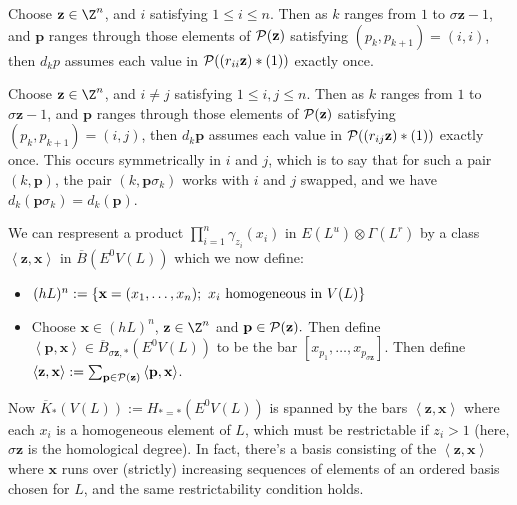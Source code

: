 \documentclass[10pt]{article}
\begin{document}
\begin{PRlieKoszulComplexCalculation}
\begin{prop}
Choose $\textbf{z}\in\Z^n$, and $i$ satisfying $1\leq i\leq n$. Then as $k$ ranges from $1$ to $\sigma \textbf{z}-1$, and $\textbf{p}$ ranges through those elements of $\mathcal{P}(\textbf{z})$ satisfying $(p_k,p_{k+1})=(i,i)$, then $d_kp$ assumes each value in $\mathcal{P}((r_{ii}\textbf{z})*(1))$ exactly once.
\end{prop}
\begin{prop}
Choose $\textbf{z}\in\Z^n$, and $i\neq j$ satisfying $1\leq i,j\leq n$. Then as $k$ ranges from $1$ to $\sigma \textbf{z}-1$, and $\textbf{p}$ ranges through those elements of $\mathcal{P}(\textbf{z})$ satisfying $(p_k,p_{k+1})=(i,j)$, then $d_k\textbf{p}$ assumes each value in $\mathcal{P}((r_{ij}\textbf{z})*(1))$ exactly once. This occurs symmetrically in $i$ and $j$, which is to say that for such a pair $(k,\textbf{p})$, the pair $(k,\textbf{p}\sigma_k)$ works with $i$ and $j$ swapped, and we have $d_k(\textbf{p}\sigma_k)=d_k(\textbf{p})$.
\end{prop}


We can respresent a product $\prod_{i=1}^{n}\gamma_{z_i}(x_i)$ in $E(L^u)\otimes \Gamma(L^r)$ by a class $\left\langle \textbf{z},\textbf{x}\right\rangle$ in $\overline{B}(E^0V(L))$ which we now define:

\begin{itemize}
\setlength{\parindent}{.25in}
\item $(hL)^n:=\{\textbf{x}=(x_1,\ldots,x_n);\ x_i\textup{ homogeneous in }V(L)\}$
\item Choose $\textbf{x}\in(hL)^n$, $\textbf{z}\in\Z^n$ and $\textbf{p}\in\mathcal{P}(\textbf{z}).$ Then define $\left\langle \textbf{p},\textbf{x}\right\rangle\in\overline{B}_{\sigma\textbf{z},*}(E^0V(L))$ to be the bar $[x_{p_1},\ldots,x_{p_{\sigma\textbf{z}}}]$. Then define $\left\langle \textbf{z},\textbf{x}\right\rangle:= \sum_{\textbf{p}\in\mathcal{P}(\textbf{z})}\left\langle \textbf{p},\textbf{x}\right\rangle$. 
\end{itemize}
Now $\overline{K}_*(V(L)):=H_{*=*}(E^0V(L))$ is spanned by the bars $\left\langle \textbf{z},\textbf{x}\right\rangle$ where each $x_i$ is a homogeneous element of $L$, which must be restrictable if $z_i>1$ (here, $\sigma\textbf{z}$ is the homological degree). In fact, there's a basis consisting of the $\left\langle \textbf{z},\textbf{x}\right\rangle$ where $\textbf{x}$ runs over (strictly) increasing sequences of elements of an ordered basis chosen for $L$, and the same restrictability condition holds.


\end{PRlieKoszulComplexCalculation}
\end{document}
